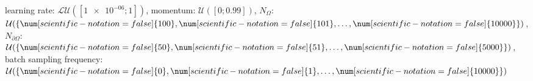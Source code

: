 learning rate: $\mathcal{LU}([\num[scientific-notation=true]{1e-06}; \num[scientific-notation=false]{1}])$, momentum: $\mathcal{U}([\num[scientific-notation=false]{0}; \num[scientific-notation=true]{0.99}])$, $N_{\Omega}$: $\mathcal{U}(\{\num[scientific-notation=false]{100},\num[scientific-notation=false]{101},\text{\dots},\num[scientific-notation=false]{10000}\})$, $N_{\partial\Omega}$: $\mathcal{U}(\{\num[scientific-notation=false]{50},\num[scientific-notation=false]{51},\text{\dots},\num[scientific-notation=false]{5000}\})$, batch sampling frequency: $\mathcal{U}(\{\num[scientific-notation=false]{0},\num[scientific-notation=false]{1},\text{\dots},\num[scientific-notation=false]{10000}\})$